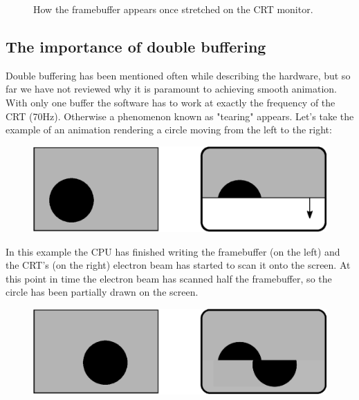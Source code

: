 \documentclass[book.tex]{subfiles}
\begin{document}
\begin{figure}[H]
  \centering
\end{figure}

\begin{figure}[H]
  \centering
  \caption{How the framebuffer appears once stretched on the CRT monitor.}
\end{figure}
\par





\subsection{The importance of double buffering}
Double buffering has been mentioned often while describing the hardware, but so far we have not reviewed why it is paramount to achieving smooth animation. With only one buffer the software has to work at exactly the frequency of the CRT (70Hz). Otherwise a phenomenon known as "tearing" appears. Let's take the example of an animation rendering a circle moving from the left to the right:
\par
\begin{figure}[H]
\centering
\includegraphics[width=\textwidth]{imgs/drawings/doublebuffer_before.eps}
\end{figure}
\par
In this example the CPU has finished writing the framebuffer (on the left) and the CRT's (on the right) electron beam has started to scan it onto the screen. At this point in time the electron beam has scanned half the framebuffer, so the circle has been partially drawn on the screen.
\par
\begin{figure}[H]
\centering
\includegraphics[width=\textwidth]{imgs/drawings/doublebuffer_after.eps}
\end{figure}
\end{document}
